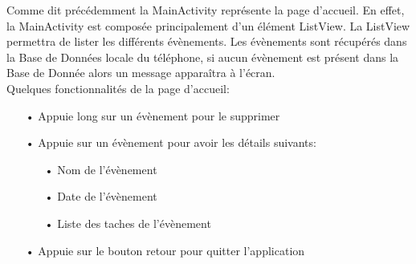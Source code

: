 \documentclass[12pt,a4paper]{report}
\begin{document}
\begin{flushleft}
\justify
Comme dit précédemment la MainActivity représente la page d'accueil. En effet, la MainActivity est composée principalement d'un élément ListView. La ListView permettra de lister les différents évènements. Les évènements sont récupérés dans la Base de Données locale du téléphone, si aucun évènement est présent dans la Base de Donnée alors un message apparaîtra à l'écran.\\

Quelques fonctionnalités de la page d'accueil:
\begin{itemize}
\item[•] Appuie long sur un évènement pour le supprimer
\item[•] Appuie sur un évènement pour avoir les détails suivants:
\begin{itemize}
\item[•] Nom de l'évènement
\item[•] Date de l'évènement
\item[•] Liste des taches de l'évènement
\end{itemize}
\item[•] Appuie sur le bouton retour pour quitter l'application
\end{itemize}
\begin{figure}[!h]
    \centering
    \begin{subfigure}[b]{0.3\textwidth}

\end{subfigure}
\end{figure}
\end{flushleft}
\end{document}

